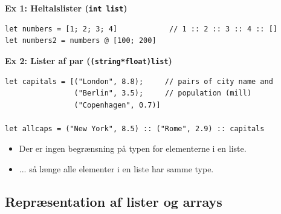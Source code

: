 \documentclass[rgb]{beamer}
\begin{document}
\begin{frame}[fragile]
\begin{footnotesize}


\vspace{2mm}
\textbf{Ex 1: Heltalslister (\texttt{int list})}

\begin{lstlisting}[numbers=none,frame=none]
let numbers = [1; 2; 3; 4]            // 1 :: 2 :: 3 :: 4 :: []
let numbers2 = numbers @ [100; 200]
\end{lstlisting}

\vspace{2mm}
\textbf{Ex 2: Lister af par (\texttt{(string*float)list})}

\begin{lstlisting}[numbers=none,frame=none]
let capitals = [("London", 8.8);     // pairs of city name and
                ("Berlin", 3.5);     // population (mill)
                ("Copenhagen", 0.7)]

let allcaps = ("New York", 8.5) :: ("Rome", 2.9) :: capitals
\end{lstlisting}

\vspace{1ex}

\begin{itemize}
\item Der er ingen begrænsning på typen for elementerne i en liste.
\item ... så længe alle elementer i en liste har samme type.
\end{itemize}
\end{footnotesize}
\end{frame}

\subsection{Repræsentation af lister og arrays}
\end{document}
